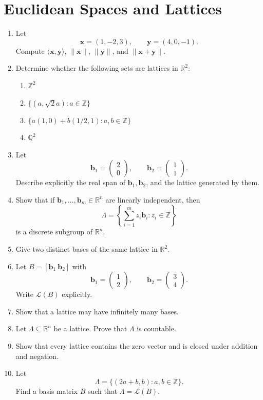 \section{Euclidean Spaces and Lattices}

\begin{enumerate}
	\item Let
	\[
	\mathbf{x}=(1,-2,3), \qquad \mathbf{y}=(4,0,-1).
	\]
	Compute \(\langle \mathbf{x},\mathbf{y}\rangle\), \(\|\mathbf{x}\|\), \(\|\mathbf{y}\|\), and \(\|\mathbf{x}+\mathbf{y}\|\).
	\item Determine whether the following sets are lattices in \(\mathbb{R}^2\):
	\begin{enumerate}
		\item $\mathbb{Z}^2$
		\item $\{(a,\sqrt{2}a): a\in\mathbb{Z}\}$
		\item $\{a(1,0)+b(1/2,1): a,b\in\mathbb{Z}\}$
		\item $\mathbb{Q}^2$
	\end{enumerate}
	\item Let
	\[
	\mathbf{b}_1=
	\begin{pmatrix}
		2\\0
	\end{pmatrix},
	\qquad
	\mathbf{b}_2=
	\begin{pmatrix}
		1\\1
	\end{pmatrix}.
	\]
	Describe explicitly the real span of \(\mathbf{b}_1,\mathbf{b}_2\), and the lattice generated by them.

	\item Show that if \(\mathbf{b}_1,\dots,\mathbf{b}_m\in \mathbb{R}^n\) are linearly independent, then
	\[
	\Lambda=\left\{\sum_{i=1}^m z_i\mathbf{b}_i : z_i\in\mathbb{Z}\right\}
	\]
	is a discrete subgroup of \(\mathbb{R}^n\).
	
	\item Give two distinct bases of the same lattice in \(\mathbb{R}^2\).

	\item Let \(B=[\mathbf{b}_1\ \mathbf{b}_2]\) with
	\[
	\mathbf{b}_1=
	\begin{pmatrix}
		1\\2
	\end{pmatrix},
	\qquad
	\mathbf{b}_2=
	\begin{pmatrix}
		3\\4
	\end{pmatrix}.
	\]
	Write \(\mathcal L(B)\) explicitly.
	
	\item Show that a lattice may have infinitely many bases.

	\item Let \(\Lambda\subseteq \mathbb{R}^n\) be a lattice. Prove that \(\Lambda\) is countable.
	\item Show that every lattice contains the zero vector and is closed under addition and negation.
	\item Let
	\[
	\Lambda=\{(2a+b,b): a,b\in\mathbb{Z}\}.
	\]
	Find a basis matrix \(B\) such that \(\Lambda=\mathcal L(B)\).
\end{enumerate}

